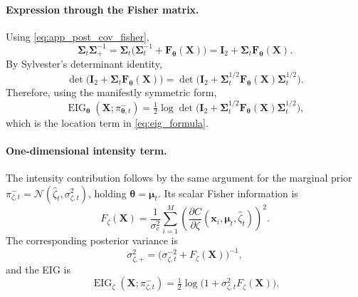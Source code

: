 \documentclass{article}
\newcommand{\bs}[1]{\boldsymbol{#1}}
\newcommand{\x}{\mathbf{x}}
\newcommand{\bX}{\mathbf{X}}
\begin{document}
\paragraph{Expression through the Fisher matrix.}
Using \eqref{eq:app_post_cov_fisher},
\begin{equation}
\bs\Sigma_t\bs\Sigma_+^{-1}
=
\bs\Sigma_t\bigl(\bs\Sigma_t^{-1}+\bs F_{\bs\theta}(\bX)\bigr)
=
\bs I_2+\bs\Sigma_t\bs F_{\bs\theta}(\bX).
\end{equation}
By Sylvester's determinant identity,
\begin{equation}
\det\!\bigl(\bs I_2+\bs\Sigma_t\bs F_{\bs\theta}(\bX)\bigr)
=
\det\!\bigl(\bs I_2+\bs\Sigma_t^{1/2}\bs F_{\bs\theta}(\bX)\bs\Sigma_t^{1/2}\bigr).
\end{equation}
Therefore, using the manifestly symmetric form,
\begin{equation}
\label{eq:app_eig_theta_final}
\operatorname{EIG}_{\bs\theta}(\bX;\pi_{\bs\theta,t}^-)
=
\tfrac12\log\det\!\bigl(
\bs I_2+\bs\Sigma_t^{1/2}\bs F_{\bs\theta}(\bX)\bs\Sigma_t^{1/2}
\bigr),
\end{equation}
which is the location term in \eqref{eq:eig_formula}.

\paragraph{One-dimensional intensity term.}
The intensity contribution follows by the same argument for the marginal prior
$\pi_{\zeta,t}^-=\mathcal N(\hat\zeta_t,\sigma_{\zeta,t}^2)$, holding $\bs\theta=\bs\mu_t$.
Its scalar Fisher information is
\begin{equation}
F_\zeta(\bX)
=
\frac{1}{\sigma_e^2}\sum_{i=1}^M
\left(\frac{\partial C}{\partial \zeta}(\x_i,\bs\mu_t,\hat\zeta_t)\right)^2.
\end{equation}
The corresponding posterior variance is
\begin{equation}
\sigma_{\zeta,+}^2=\bigl(\sigma_{\zeta,t}^{-2}+F_\zeta(\bX)\bigr)^{-1},
\end{equation}
and the EIG is
\begin{equation}
\label{eq:app_eig_zeta_final}
\operatorname{EIG}_{\zeta}(\bX;\pi_{\zeta,t}^-)
=
\tfrac12\log\!\bigl(1+\sigma_{\zeta,t}^2F_\zeta(\bX)\bigr).
\end{equation}
\end{document}
